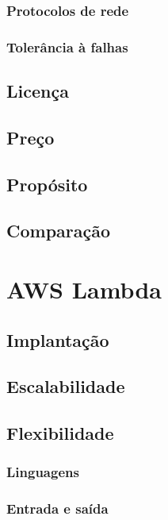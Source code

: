 \subsubsection{Protocolos de rede}

\subsubsection{Tolerância à falhas}

\subsection{Licença}

\subsection{Preço}

\subsection{Propósito}

\subsection{Comparação}

\section{AWS Lambda}

\subsection{Implantação}

\subsection{Escalabilidade}

\subsection{Flexibilidade}

\subsubsection{Linguagens}
\subsubsection{Entrada e saída}

